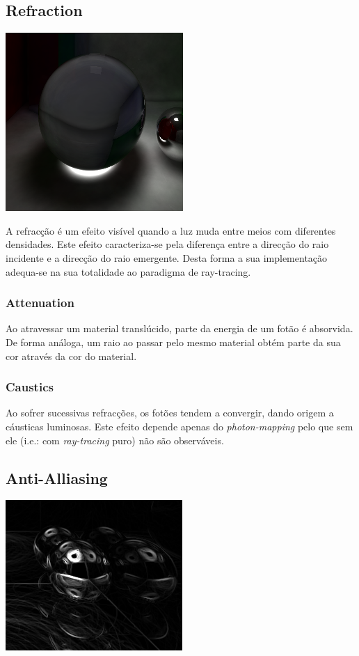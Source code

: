 \documentclass[a4paper]{article}
\begin{document}
\subsection{Refraction}
\begin{center}
	\includegraphics[scale=0.50]{images/caustics.png}
	\label{fig:caustics}
\end{center}

\indent A refracção é um efeito visível quando a luz muda entre meios com diferentes densidades.
Este efeito caracteriza-se pela diferença entre a direcção do raio incidente e a direcção do raio emergente. 
Desta forma a sua implementação adequa-se na sua totalidade ao paradigma de ray-tracing.

\subsubsection{Attenuation}
\indent \indent Ao atravessar um material translúcido, parte da energia de um fotão é absorvida. De forma análoga,
um raio ao passar pelo mesmo material obtém parte da sua cor através da cor do material.

\subsubsection{Caustics}
\indent \indent Ao sofrer sucessivas refracções, os fotões tendem a convergir, dando origem a cáusticas luminosas.
Este efeito depende apenas do \emph{photon-mapping} pelo que sem ele (i.e.: com \emph{ray-tracing} puro)
não são observáveis.

\cleardoublepage
\subsection{Anti-Alliasing}
\begin{center}
	\includegraphics[scale=0.50]{images/sobel.png}
	\label{fig:sobel}
\end{center}
\end{document}
